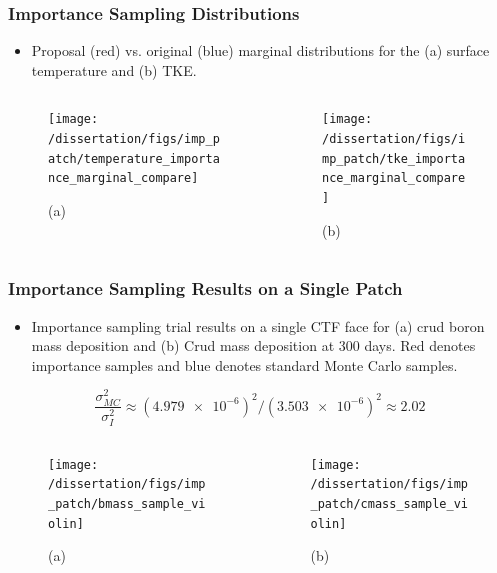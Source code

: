 \documentclass[t, pdftex]{beamer}
\begin{document}
\begin{frame}
\frametitle{Importance Sampling Distributions}
\vspace{-16pt}
\begin{itemize}
    \item Proposal (red) vs. original (blue) marginal distributions for the (a) surface temperature and (b) TKE.
\end{itemize}

\begin{columns}
    \begin{column}{0.5\textwidth}
\begin{figure}[]
\centering
\texttt{[image: /dissertation/figs/imp\_patch/temperature\_importance\_marginal\_compare]}
\caption{\centering (a)}
\label{model_overview}
\end{figure}
\end{column}
\begin{column}{0.5\textwidth}
\begin{figure}[]
\centering
\texttt{[image: /dissertation/figs/imp\_patch/tke\_importance\_marginal\_compare]}\\
\caption{\centering (b)}
\label{model_overview}
\end{figure}
\end{column}
\end{columns}
\end{frame}

\begin{frame}
\frametitle{\small Importance Sampling Results on a Single Patch}
\vspace{-16pt}
\begin{itemize}
    \item Importance sampling trial results on a single CTF face for (a) crud boron mass deposition and (b) Crud mass deposition at 300 days.  Red denotes importance samples and blue denotes standard Monte Carlo samples.  
\end{itemize}
\[ \frac{\sigma^2_{MC}}{\sigma^2_{I}} \approx (\num{4.979e-6})^2 / (\num{3.503e-6})^2  \approx 2.02 \]
\vspace{-28pt}
\begin{columns}
    \begin{column}{0.5\textwidth}
\begin{figure}[]
    \centering
    \texttt{[image: /dissertation/figs/imp\_patch/bmass\_sample\_violin]}
    \caption{\centering (a)}
    \label{model_overview}
\end{figure}
\end{column}
\begin{column}{0.5\textwidth}
\begin{figure}[]
    \centering
    \texttt{[image: /dissertation/figs/imp\_patch/cmass\_sample\_violin]}\\
    \caption{\centering (b)}
    \label{model_overview}
\end{figure}
\end{column}
\end{columns}
\end{frame}
\end{document}
